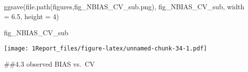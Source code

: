 \documentclass[
]{article}
\newenvironment{Shaded}{\begin{snugshade}}{\end{snugshade}}
\newcommand{\AttributeTok}[1]{\textcolor[rgb]{0.77,0.63,0.00}{#1}}
\newcommand{\DecValTok}[1]{\textcolor[rgb]{0.00,0.00,0.81}{#1}}
\newcommand{\FloatTok}[1]{\textcolor[rgb]{0.00,0.00,0.81}{#1}}
\newcommand{\FunctionTok}[1]{\textcolor[rgb]{0.00,0.00,0.00}{#1}}
\newcommand{\NormalTok}[1]{#1}
\newcommand{\StringTok}[1]{\textcolor[rgb]{0.31,0.60,0.02}{#1}}
\begin{document}
\begin{Shaded}
\begin{Highlighting}[]
\FunctionTok{ggsave}\NormalTok{(}\FunctionTok{file.path}\NormalTok{(}\StringTok{\textquotesingle{}figures\textquotesingle{}}\NormalTok{,}\StringTok{\textquotesingle{}fig\_NBIAS\_CV\_sub.png\textquotesingle{}}\NormalTok{), fig\_NBIAS\_CV\_sub, }\AttributeTok{width =} \FloatTok{6.5}\NormalTok{, }\AttributeTok{height =} \DecValTok{4}\NormalTok{)}

\NormalTok{fig\_NBIAS\_CV\_sub}
\end{Highlighting}
\end{Shaded}

\texttt{[image: 1Report\_files/figure-latex/unnamed-chunk-34-1.pdf]}

\#\#4.3 observed BIAS vs.~CV
\end{document}
